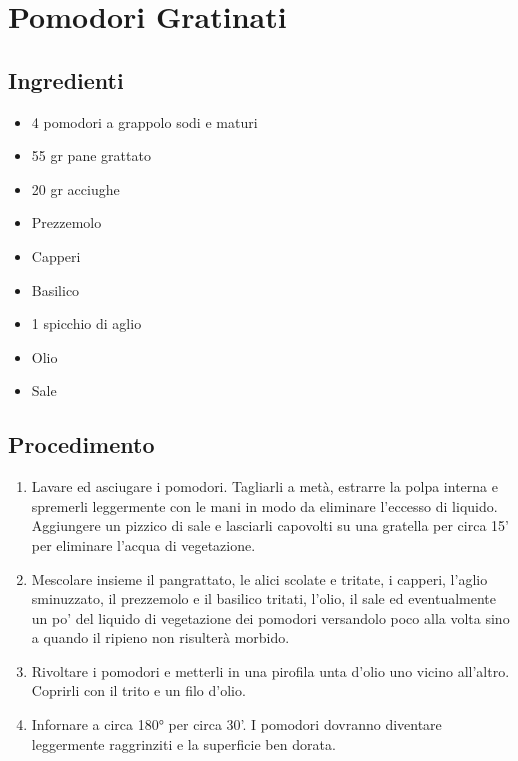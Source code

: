 \section{Pomodori Gratinati}
\subsection{Ingredienti}
\begin{itemize}
\item 4 pomodori a grappolo sodi e maturi  
\item 55 gr pane grattato   
\item 20 gr acciughe  
\item Prezzemolo  
\item Capperi  
\item Basilico  
\item 1 spicchio di aglio  
\item Olio  
\item Sale
\end{itemize}
\subsection{Procedimento}
\begin{enumerate}
\item  Lavare ed asciugare i pomodori. Tagliarli a metà, estrarre la polpa interna e spremerli leggermente con le mani in modo da eliminare l'eccesso di liquido. Aggiungere un pizzico di sale e lasciarli capovolti su una gratella per circa 15' per eliminare l'acqua di vegetazione.  
\item  Mescolare insieme il pangrattato, le alici scolate e tritate, i capperi, l'aglio sminuzzato, il prezzemolo e il basilico tritati, l'olio, il sale ed eventualmente un po' del liquido di vegetazione dei pomodori versandolo poco alla volta sino a quando il ripieno non risulterà morbido.  
\item  Rivoltare i pomodori e metterli in una pirofila unta d'olio uno vicino all'altro. Coprirli con il trito e un filo d'olio.  
\item  Infornare a circa 180° per circa 30'. I pomodori dovranno diventare leggermente raggrinziti e la superficie ben dorata.
\end{enumerate}
